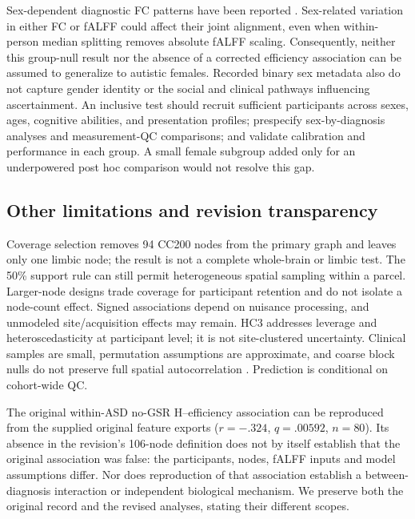 \documentclass[10pt,letterpaper]{article}
\begin{document}
Sex-dependent diagnostic FC patterns have been reported \cite{Alaerts2016revision}.
Sex-related variation in either FC or fALFF could affect their joint alignment,
even when within-person median splitting removes absolute fALFF scaling.
Consequently, neither this group-null result nor the absence of a corrected
efficiency association can be assumed to generalize to autistic females.
Recorded binary sex metadata also do not capture gender identity or the social
and clinical pathways influencing ascertainment. An inclusive test should recruit
sufficient participants across sexes, ages, cognitive abilities, and presentation
profiles; prespecify sex-by-diagnosis analyses and measurement-QC comparisons;
and validate calibration and performance in each group. A small female subgroup
added only for an underpowered post hoc comparison would not resolve this gap.

\subsection*{Other limitations and revision transparency}
Coverage selection removes 94 CC200 nodes from the primary graph and leaves only
one limbic node; the result is not a complete whole-brain or limbic test. The
50\% support rule can still permit heterogeneous spatial sampling within a parcel.
Larger-node designs trade coverage for participant retention and do not isolate
a node-count effect. Signed associations depend on nuisance processing, and
unmodeled site/acquisition effects may remain. HC3 addresses leverage and
heteroscedasticity at participant level; it is not site-clustered uncertainty.
Clinical samples are small, permutation assumptions are approximate, and coarse
block nulls do not preserve full spatial autocorrelation
\cite{Markello2021revision}. Prediction is conditional on cohort-wide QC.

The original within-ASD no-GSR H--efficiency association can be reproduced from
the supplied original feature exports ($r=-.324$, $q=.00592$, $n=80$). Its absence
in the revision's 106-node definition does not by itself establish that the
original association was false: the participants, nodes, fALFF inputs and model
assumptions differ. Nor does reproduction of that association establish a
between-diagnosis interaction or independent biological mechanism. We preserve
both the original record and the revised analyses, stating their different scopes.
\end{document}
